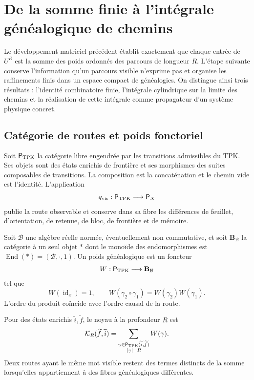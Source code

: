 \section{De la somme finie à l’intégrale généalogique de chemins}
\label{sec:integral-genealogica-caminos-rev2}

Le développement matriciel précédent établit exactement que chaque entrée de \(U^R\) est la somme des poids ordonnés des parcours de longueur \(R\). L’étape suivante conserve l’information qu’un parcours visible n’exprime pas et organise les raffinements finis dans un espace compact de généalogies. On distingue ainsi trois résultats : l’identité combinatoire finie, l’intégrale cylindrique sur la limite des chemins et la réalisation de cette intégrale comme propagateur d’un système physique concret.

\subsection{Catégorie de routes et poids fonctoriel}

Soit \(\mathsf P_{\rm TPK}\) la catégorie libre engendrée par les transitions admissibles du TPK. Ses objets sont des états enrichis de frontière et ses morphismes des suites composables de transitions. La composition est la concaténation et le chemin vide est l’identité. L’application
\[
 q_{\rm vis}:\mathsf P_{\rm TPK}\longrightarrow\mathsf P_X
\]
publie la route observable et conserve dans sa fibre les différences de feuillet,
d’orientation, de retenue, de bloc, de frontière et de mémoire.


\begin{definition}
\label{def:peso-genealogico-caminos-rev2}
Soit \(\mathcal B\) une algèbre réelle normée, éventuellement non commutative, et
soit \(\mathbf B_{\mathcal B}\) la catégorie à un seul objet \(\ast\) dont le
monoïde des endomorphismes est
\(\operatorname{End}(\ast)=(\mathcal B,\cdot,1)\). Un poids généalogique est un foncteur
\[
 W:\mathsf P_{\rm TPK}\longrightarrow\mathbf B_{\mathcal B}
\]
tel que
\[
 W(\operatorname{id}_x)=1,
 \qquad
 W(\gamma_2\circ\gamma_1)=W(\gamma_2)W(\gamma_1).
\]
L’ordre du produit coïncide avec l’ordre causal de la route.
\end{definition}

Pour des états enrichis \(\widetilde i,\widetilde f\), le noyau à la
profondeur \(R\) est
\begin{equation}
 \mathcal K_R(\widetilde f,\widetilde i)
 =\sum_{\substack{
   \gamma\in\mathsf P_{\rm TPK}(\widetilde i,\widetilde f)\\
   |\gamma|=R}}
 W(\gamma).
 \label{eq:kernel-genealogico-finito-rev2}
\end{equation}
Deux routes ayant le même mot visible restent des termes distincts de la somme
lorsqu’elles appartiennent à des fibres généalogiques différentes.

